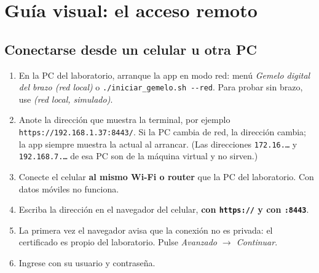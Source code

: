 \documentclass[a4paper,11pt]{article}
\newcommand{\codigo}[1]{\texttt{#1}}
\begin{document}
\section{Guía visual: el acceso remoto}\label{sec:remoto}

\subsection{Conectarse desde un celular u otra PC}
\begin{enumerate}
\item En la PC del laboratorio, arranque la app en modo red: menú \emph{Gemelo digital del brazo (red local)} o \codigo{./iniciar\_gemelo.sh -{}-red}. Para probar sin brazo, use \emph{(red local, simulado)}.
\item Anote la dirección que muestra la terminal, por ejemplo \codigo{https://192.168.1.37:8443/}. Si la PC cambia de red, la dirección cambia; la app siempre muestra la actual al arrancar. (Las direcciones \codigo{172.16.\dots} y \codigo{192.168.7.\dots} de esa PC son de la máquina virtual y no sirven.)
\item Conecte el celular \textbf{al mismo Wi-Fi o router} que la PC del laboratorio. Con datos móviles no funciona.
\item Escriba la dirección en el navegador del celular, \textbf{con \codigo{https://} y con \codigo{:8443}}.
\item La primera vez el navegador avisa que la conexión no es privada: el certificado es propio del laboratorio. Pulse \emph{Avanzado $\rightarrow$ Continuar}.
\item Ingrese con su usuario y contraseña.
\end{enumerate}
\end{document}
